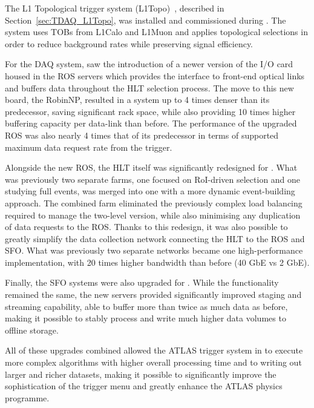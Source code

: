 \documentclass[cernpreprint, atlasdraft=false, UKenglish,british,orcidlogo, texmf, orcidlogo]{atlasdoc}
\begin{document}
The \gls{L1} Topological trigger system (L1Topo)~\cite{TRIG-2019-02}, described in Section~\ref{sec:TDAQ_L1Topo}, was installed and commissioned during \RunTwo. The system uses \glspl{TOB} from \gls{L1Calo} and \gls{L1Muon} and applies topological selections in order to reduce background rates while preserving signal efficiency.
 
For the \gls{DAQ} system, \RunTwo saw the introduction of a newer version of the \gls{I/O} card housed in the \gls{ROS} servers which provides the interface to front-end optical links and buffers data throughout the \gls{HLT} selection process. The move to this new board, the RobinNP, resulted in a system up to 4 times denser than its predecessor, saving significant rack space, while also providing 10 times higher buffering capacity per data-link than before. The performance of the upgraded \gls{ROS} was also nearly 4 times that of its predecessor in terms of supported maximum data request rate from the trigger.
 
Alongside the new \gls{ROS}, the \gls{HLT} itself was significantly redesigned for \RunTwo. What was previously two separate farms, one focused on \gls{RoI}-driven selection and one studying full events, was merged into one with a more dynamic event-building approach. The combined farm eliminated the previously complex load balancing required to manage the two-level version, while also minimising any duplication of data requests to the \gls{ROS}. Thanks to this redesign, it was also possible to greatly simplify the data collection network connecting the \gls{HLT} to the \gls{ROS} and \gls{SFO}. What was previously two separate networks became one high-performance implementation, with 20 times higher bandwidth than before (40 \gls{GbE} vs 2 \gls{GbE}).
 
Finally, the \gls{SFO} systems were also upgraded for \RunTwo. While the functionality remained the same, the new servers provided significantly improved staging and streaming capability, able to buffer more than twice as much data as before, making it possible to stably process and write much higher data volumes to offline storage.
 
All of these upgrades combined allowed the
ATLAS trigger system
in \RunTwo to execute more complex algorithms with higher overall processing time and to writing out larger and richer datasets, making it possible to significantly improve the sophistication of the trigger menu and greatly enhance the ATLAS physics programme.
 
\end{document}
